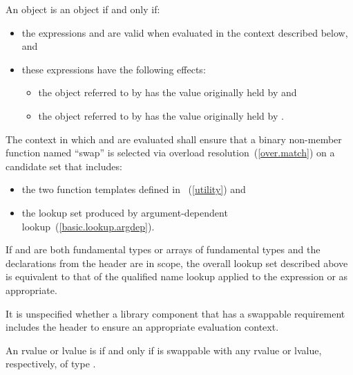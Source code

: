 \pnum
An object  is  an object  if and only if:

\begin{itemize}
\item the expressions  and  are valid when
evaluated in the context described below, and

\item these expressions have the following effects:

\begin{itemize}
\item the object referred to by  has the value originally held by  and
\item the object referred to by  has the value originally held by .
\end{itemize}
\end{itemize}

\pnum
The context in which  and  are evaluated shall
ensure that a binary non-member function named ``swap'' is selected via overload
resolution~(\ref{over.match}) on a candidate set that includes:

\begin{itemize}
\item the two  function templates defined in
~(\ref{utility}) and

\item the lookup set produced by argument-dependent lookup~(\ref{basic.lookup.argdep}).
\end{itemize}

\begin{note} If  and  are both fundamental types or arrays of
fundamental types and the declarations from the header  are in
scope, the overall lookup set described above is equivalent to that of the
qualified name lookup applied to the expression  or
 as appropriate. \end{note}

\begin{note} It is unspecified whether a library component that has a swappable
requirement includes the header  to ensure an appropriate
evaluation context. \end{note}

\pnum
An rvalue or lvalue  is  if and only if  is
swappable with any rvalue or lvalue, respectively, of type .

